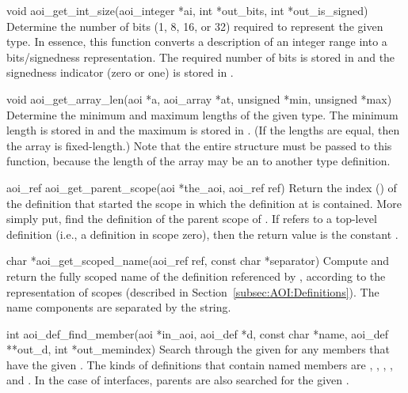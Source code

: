 \begin{cprototypelist}
  \item[void aoi_get_int_size(aoi_integer *ai, int *out_bits,
                              int *out_is_signed)]
  Determine the number of bits (1, 8, 16, or 32) required to represent the
  given  type.  In essence, this function converts a
  description of an integer range into a bits/signedness representation.  The
  required number of bits is stored in  and the
  signedness indicator (zero or one) is stored in .

  \item[void aoi_get_array_len(aoi *a, aoi_array *at, unsigned *min,
                               unsigned *max)]
  Determine the minimum and maximum lengths of the given 
  type.  The minimum length is stored in  and the maximum is
  stored in .  (If the lengths are equal, then the array is
  fixed-length.)  Note that the entire  structure must be passed to
  this function, because the length of the array may be an
   to another \AOI{} type definition.

  \item[aoi_ref aoi_get_parent_scope(aoi *the_aoi, aoi_ref ref)]
  Return the index () of the \AOI{} definition that started the
  scope in which the definition at  is contained.  More simply
  put, find the definition of the parent scope of .  If
   refers to a top-level definition (i.e., a definition in
  scope zero), then the return value is the constant
  .

  \item[char *aoi_get_scoped_name(aoi_ref ref, const char *separator)]
  Compute and return the fully scoped name of the \AOI{} definition referenced
  by , according to the \AOI{} representation of scopes (described
  in Section~\ref{subsec:AOI:Definitions}).  The name components are separated
  by the  string.

  \item[int aoi_def_find_member(aoi *in_aoi, aoi_def *d, const char *name,
                                aoi_def **out_d, int *out_memindex)]
  Search through the given   for any members that
  have the given .  The kinds of definitions that contain
  named members are , , ,
  , and .  In the case of interfaces, parents
  are also searched for the given .


\end{cprototypelist}
